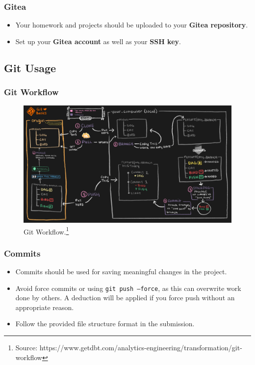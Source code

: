 \documentclass[
	11pt, %
]{beamer}
\begin{document}
\begin{frame}
	\frametitle{Gitea}
 
	\begin{itemize}
    \item Your homework and projects should be uploaded to your \textbf{Gitea repository}.
    \item Set up your \textbf{Gitea account} as well as your \textbf{SSH key}.
\end{itemize}

\end{frame}


\subsection{Git Usage}

\begin{frame}
	\frametitle{Git Workflow}
	
	\begin{figure}
		\includegraphics[width=0.8\linewidth]{git_workflow.png}
		\caption{Git Workflow.\footnote{Source: https://www.getdbt.com/analytics-engineering/transformation/git-workflow}}
	\end{figure}
\end{frame}

\begin{frame}
	\frametitle{Commits}
 
	\begin{itemize}
    \item Commits should be used for saving meaningful changes in the project.
    \item Avoid force commits or using \texttt{git push --force}, as this can overwrite work done by others. A deduction will be applied if you force push without an appropriate reason.
    \item Follow the provided file structure format in the submission.
\end{itemize}

\end{frame}
\end{document}
